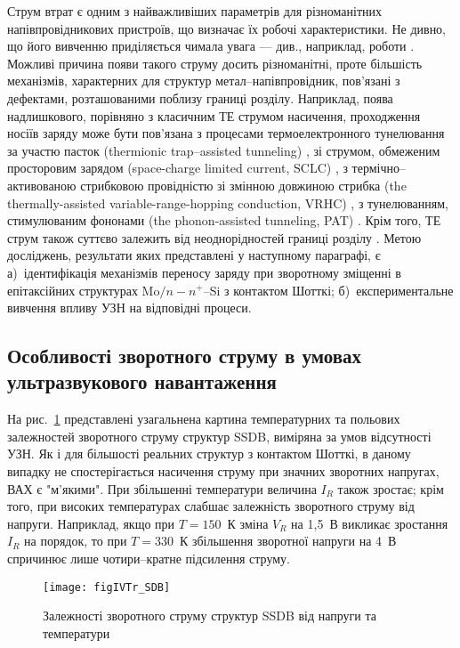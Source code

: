 Струм втрат є одним з найважливіших параметрів для різноманітних напівпровідникових пристроїв, що визначає їх робочі характеристики.
Не дивно, що його вивченню приділяється чимала увага --- див., наприклад, роботи \cite{Sathaiya,VRH:Shan,Pipinys2006,Referi1,Referi2}.
Можливі причина появи такого струму досить різноманітні, проте більшість механізмів, характерних для структур метал--напівпровідник,
пов'язані з дефектами, розташованими поблизу границі розділу.
Наприклад, поява надлишкового, порівняно з класичним ТЕ струмом насичення, проходження носіїв заряду може
бути пов'язана
з процесами термоелектронного тунелювання за участю пасток (thermionic trap--assisted tunneling) \cite{Sathaiya},
зі струмом, обмеженим просторовим зарядом (space-charge limited current, SCLC) \cite{Abu-Samaha,Jafar},
з термічно--активованою стрибковою провідністю зі змінною довжиною стрибка (the thermally-assisted variable-range-hopping conduction, VRHC) \cite{Jafar,VRH:Lee,VRH:Shan},
з тунелюванням, стимулюваним фононами (the phonon-assisted tunneling, PAT) \cite{Pipinys1999,Pipinys2006}.
Крім того, ТЕ струм також суттєво залежить від неоднорідностей границі розділу  \cite{Tung:MSE}.
Метою досліджень, результати яких представлені у наступному параграфі, є
а)~ідентифікація механізмів переносу заряду при зворотному зміщенні в епітаксійних структурах Mo$/n-n^+$--Si з контактом Шотткі;
б)~експериментальне вивчення впливу УЗН на відповідні процеси.

\subsection{Особливості зворотного струму в умовах ультразвукового навантаження}

На рис.~\ref{figIVTr_SDB} представлені узагальнена картина температурних та польових залежностей зворотного струму структур SSDB,
виміряна за умов відсутності УЗН.
Як і для більшості реальних структур з контактом Шотткі, в даному випадку не спостерігається насичення струму при
значних зворотних напругах, ВАХ є "м'якими".
При збільшенні температури величина $I_R$ також зростає;
крім того, при високих температурах слабшає залежність зворотного струму від напруги.
Наприклад, якщо при $T=150$~К зміна $V_R$ на 1,5~В викликає зростання $I_R$ на порядок,
то при $T=330$~К збільшення зворотної напруги на 4~В спричинює лише чотири--кратне підсилення струму.

\begin{figure}
\center
\texttt{[image: figIVTr\_SDB]}
\caption{\label{figIVTr_SDB}
Залежності зворотного струму структур SSDB від напруги та температури
}%
\end{figure}

